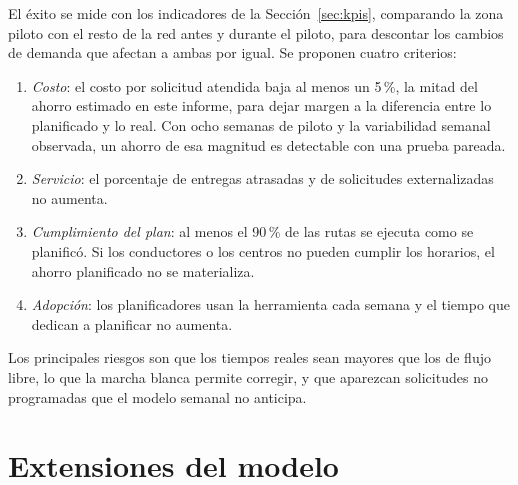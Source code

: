  El éxito se mide con los indicadores de la Sección~\ref{sec:kpis}, comparando la zona piloto con el resto de la red antes y durante el piloto, para descontar los cambios de demanda que afectan a ambas por igual. Se proponen cuatro criterios:
\begin{enumerate}\itemsep0pt
\item \emph{Costo}: el costo por solicitud atendida baja al menos un 5\,\%, la mitad del ahorro estimado en este informe, para dejar margen a la diferencia entre lo planificado y lo real. Con ocho semanas de piloto y la variabilidad semanal observada, un ahorro de esa magnitud es detectable con una prueba pareada.
\item \emph{Servicio}: el porcentaje de entregas atrasadas y de solicitudes externalizadas no aumenta.
\item \emph{Cumplimiento del plan}: al menos el 90\,\% de las rutas se ejecuta como se planificó. Si los conductores o los centros no pueden cumplir los horarios, el ahorro planificado no se materializa.
\item \emph{Adopción}: los planificadores usan la herramienta cada semana y el tiempo que dedican a planificar no aumenta.
\end{enumerate}
Los principales riesgos son que los tiempos reales sean mayores que los de flujo libre, lo que la marcha blanca permite corregir, y que aparezcan solicitudes no programadas que el modelo semanal no anticipa.

\section{Extensiones del modelo}\label{sec:extensiones}

